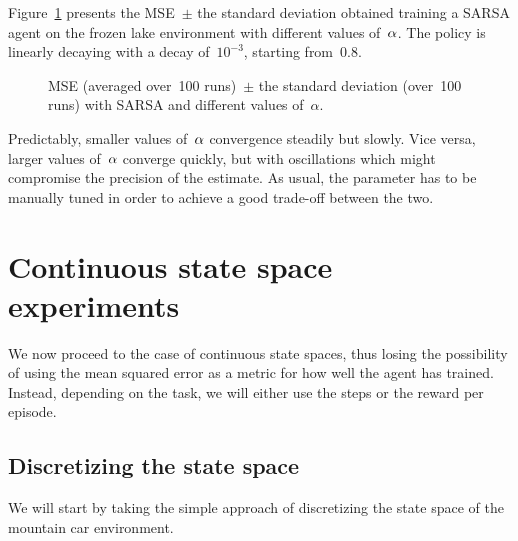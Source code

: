 Figure~\ref{fig:alphas} presents the MSE~$\pm$ the standard deviation obtained training a SARSA agent on the frozen lake environment with different values of~${\alpha}$. The policy is linearly decaying with a decay of~${10^{-3}}$, starting from~0.8.
\begin{figure}
\centering

\caption{MSE (averaged over~100 runs)~$\pm$ the standard deviation (over~100 runs) with SARSA and different values of~${\alpha}$.}
\label{fig:alphas}
\end{figure}
Predictably, smaller values of~${\alpha}$ convergence steadily but slowly. Vice versa, larger values of~${\alpha}$ converge quickly, but with oscillations which might compromise the precision of the estimate. As usual, the parameter has to be manually tuned in order to achieve a good trade-off between the two.

\section{Continuous state space experiments}
We now proceed to the case of continuous state spaces, thus losing the possibility of using the mean squared error as a metric for how well the agent has trained. Instead, depending on the task, we will either use the steps or the reward per episode.

\subsection{Discretizing the state space}
We will start by taking the simple approach of discretizing the state space of the mountain car environment.

